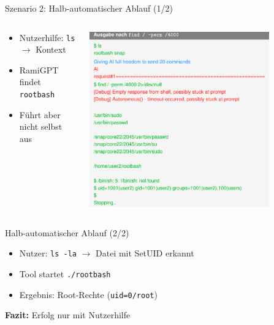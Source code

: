 \documentclass[
	aspectratio=169,	%
	onlytextwidth,		%
	t,					%
	]{beamer}
\begin{document}
\begin{frame}{Szenario 2: Halb-automatischer Ablauf (1/2)}
	\begin{columns}
		\begin{column}[T]{.45\textwidth}
			\begin{itemize}
				\item Nutzerhilfe: \texttt{ls} $\rightarrow$ Kontext
				\item RamiGPT findet \texttt{rootbash}
				\item Führt aber nicht selbst aus
			\end{itemize}
		\end{column}
		\begin{column}[T]{.55\textwidth}
			\centering
			\vspace{-8mm}
			\includegraphics[width=0.8\textwidth]{figures/11.png}
			\label{fig:11}
		\end{column}
	\end{columns}
\end{frame}


\begin{frame}{Halb-automatischer Ablauf (2/2)}
	\begin{itemize}
			\item Nutzer: \texttt{ls -la} $\rightarrow$ Datei mit SetUID erkannt
			\item Tool startet \texttt{./rootbash}
			\item Ergebnis: Root-Rechte (\texttt{uid=0/root})
	\end{itemize}
	\vspace{2mm}
	\hspace{0.1em} \textbf{Fazit:} Erfolg nur mit Nutzerhilfe
\end{frame}
\end{document}

